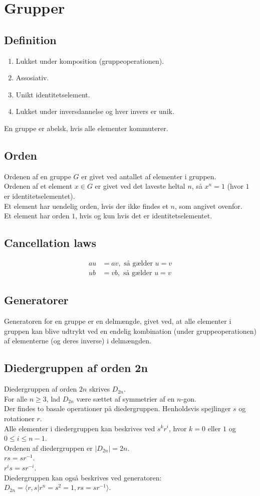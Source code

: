 \documentclass[11pt]{article}
\begin{document}
\section*{Grupper}
\subsection*{Definition}
\begin{enumerate}
  \item Lukket under komposition (gruppeoperationen).
  \item Assosiativ.
  \item Unikt identitetselement.
  \item Lukket under inversdannelse og hver invers er unik.
\end{enumerate}

En gruppe er abelsk, hvis alle elementer kommuterer.
\subsection*{Orden}
Ordenen af en gruppe $G$ er givet ved antallet af elementer i gruppen.\\
Ordenen af et element $x \in G$ er givet ved det laveste heltal $n$, så $x^n = 1$ (hvor $1$ er identitetselementet).\\
Et element har uendelig orden, hvis der ikke findes et $n$, som angivet ovenfor.\\
Et element har orden $1$, hvis og kun hvis det er identitetselementet.
\subsection*{Cancellation laws}
\begin{align*}
  au &= av, \text{ så gælder } u = v\\
  ub &= vb, \text{ så gælder } u = v
\end{align*}
\subsection*{Generatorer}
Generatoren for en gruppe er en delmængde, givet ved, at alle elementer i gruppen kan blive udtrykt ved en endelig kombination (under gruppeoperationen) af elementerne (og deres inverse) i delmængden.
\subsection*{Diedergruppen af orden 2n}
Diedergruppen af orden $2n$ skrives $D_{2n}$.\\
For alle $n \geq 3$, lad $D_{2n}$ være sættet af symmetrier af en $n$-gon.\\
Der findes to basale operationer på diedergruppen. Henholdsvis spejlinger $s$ og rotationer $r$.\\
Alle elementer i diedergruppen kan beskrives ved $s^k r^i$, hvor $k = 0$ eller $1$ og $0 \leq i \leq n-1$.\\
Ordenen af diedergruppen er $|D_{2n}| = 2n$.\\
$r s = s r^{-1}$.\\
$r^i s = s r^{-i}$.\\
Diedergruppen kan også beskrives ved generatoren: $D_{2n} = \langle r, s | r^n = s^2 = 1, rs = s r^{-1} \rangle$.
\end{document}
